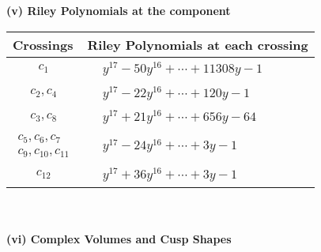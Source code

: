 \documentclass[1p]{elsarticle_modified}
\theoremstyle{definition}
\begin{document}
\flushleft \textbf{(v) Riley Polynomials at the component}\newline \\
\begin{tabular}{m{50pt}|m{274pt}}
Crossings & \hspace{64pt}Riley Polynomials at each crossing \\
\hline $$\begin{aligned}c_{1}\end{aligned}$$&$\begin{aligned}
&y^{17}-50 y^{16}+\cdots+11308 y-1
\end{aligned}$\\
\hline $$\begin{aligned}c_{2},c_{4}\end{aligned}$$&$\begin{aligned}
&y^{17}-22 y^{16}+\cdots+120 y-1
\end{aligned}$\\
\hline $$\begin{aligned}c_{3},c_{8}\end{aligned}$$&$\begin{aligned}
&y^{17}+21 y^{16}+\cdots+656 y-64
\end{aligned}$\\
\hline $$\begin{aligned}c_{5},c_{6},c_{7}\\c_{9},c_{10},c_{11}\end{aligned}$$&$\begin{aligned}
&y^{17}-24 y^{16}+\cdots+3 y-1
\end{aligned}$\\
\hline $$\begin{aligned}c_{12}\end{aligned}$$&$\begin{aligned}
&y^{17}+36 y^{16}+\cdots+3 y-1
\end{aligned}$\\
\hline
\end{tabular}\\~\\
\newpage\flushleft \textbf{(vi) Complex Volumes and Cusp Shapes}
\end{document}
